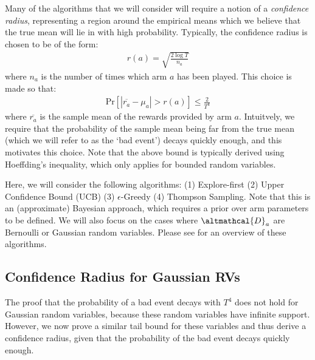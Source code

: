 \documentclass[a4paper]{article}
\begin{document}
	Many of the algorithms that we will consider will require a notion of a \emph{confidence radius}, representing a region around the empirical means which we believe that the true mean will lie in with high probability. Typically, the confidence radius is chosen to be of the form:
	\begin{align}
	r(a) = \sqrt{\frac{2 \log T}{n_a}}
	\end{align} 
	where $n_a$ is the number of times which arm $a$ has been played. This choice is made so that:
	\begin{align}
	\text{Pr}[|\overline{r_a} - \mu_a| > r(a)] \leq \frac{2}{T^4}
	\end{align}
	where $\overline{r_a}$ is the sample mean of the rewards provided by arm $a$. Intuitvely, we require that the probability of the sample mean being far from the true mean (which we will refer to as the `bad event') decays quickly enough, and this motivates this choice. Note that the above bound is typically derived using Hoeffding's inequality, which only applies for bounded random variables. 
	
	Here, we will consider the following algorithms: (1) Explore-first (2) Upper Confidence Bound (UCB) (3) $\epsilon$-Greedy (4) Thompson Sampling. Note that this is an (approximate) Bayesian approach, which requires a prior over arm parameters to be defined. We will also focus on the cases where $\altmathcal{D}_a$ are Bernoulli or Gaussian random variables. Please see \cite{book} for an overview of these algorithms. 
	
	\subsection{Confidence Radius for Gaussian RVs}
	The proof that the probability of a bad event decays with $T^4$ does not hold for Gaussian random variables, because these random variables have infinite support. However, we now prove a similar tail bound for these variables and thus derive a confidence radius, given that the probability of the bad event decays quickly enough. 
	
\end{document}
